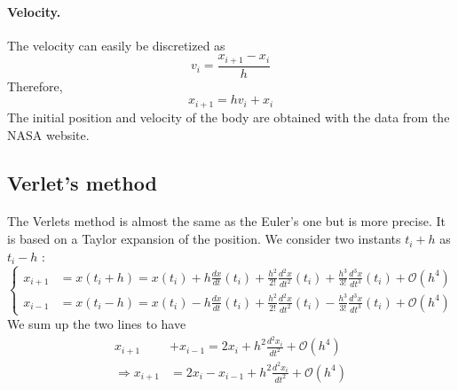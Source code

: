 \documentclass[a4paper, twoside, 11pt]{report}
\theoremstyle{theorem}
\theoremstyle{remark}
\theoremstyle{exemple}
\begin{document}
             \paragraph{Velocity.}The velocity can easily be discretized as
                \begin{equation*}
                      v_i = \frac{x_{i+1}-x_i}{h}
                  \end{equation*}
             Therefore,
                 \begin{equation*}
                    x_{i+1} = hv_i + x_i
                    \tag{9}
                \end{equation*}   
            The initial position and velocity of the body are obtained with the data from the NASA website.
            
        \subsection{Verlet's method}
            \paragraph{}The Verlets method is almost the same as the Euler's one but is more precise. It is based on a Taylor expansion of the position. We consider two instants $t_i+h$ as $t_i-h$ :
                \begin{equation*}
                    \left\{ 
                        \begin{aligned}
                            x_{i+1} &= x(t_i+h) = x(t_i) + h\frac{dx}{dt}(t_i) + \frac{h^2}{2!}\frac{d^2x}{dt^2}(t_i) + \frac{h^3}{3!}\frac{d^3x}{dt^3}(t_i)+\mathcal{O}(h^4)\\
                            x_{i-1} &= x(t_i-h) = x(t_i) - h\frac{dx}{dt}(t_i) + \frac{h^2}{2!}\frac{d^2x}{dt^2}(t_i) - \frac{h^3}{3!}\frac{d^3x}{dt^3}(t_i)+\mathcal{O}(h^4)
                        \end{aligned}
                    \right.
                \end{equation*}
            We sum up the two lines to have
                \begin{align*}
                    x_{i+1} &+ x_{i-1} = 2x_i + h^2\frac{d^2x_i}{dt^2} + \mathcal{O}(h^4) \\
                    \Rightarrow x_{i+1} &= 2x_i - x_{i-1} + h^2\frac{d^2x_i}{dt^2} + \mathcal{O}(h^4)
                \end{align*}
            
\end{document}
